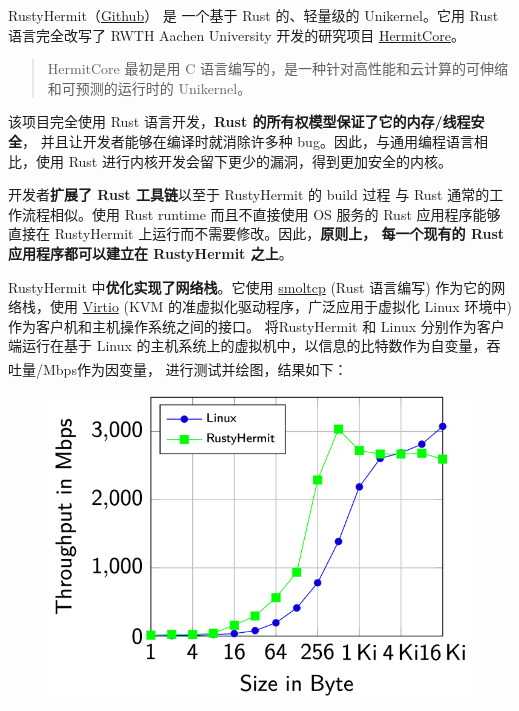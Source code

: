\documentclass[UTF8,fontset=none,linespread=1.15]{ctexart}
\let\nosupcite\cite
\renewcommand*{\cite}[1]{\textsuperscript{\nosupcite{#1}}}
\begin{document}
RustyHermit（\href{https://github.com/hermitcore/rusty-hermit}{Github}） 是
一个基于 Rust 的、轻量级的 Unikernel。它用 Rust 语言完全改写了 RWTH Aachen University
 开发的研究项目 \href{http://hermitcore.org/}{HermitCore}。

\begin{quote}
HermitCore 最初是用 C 语言编写的，是一种针对高性能和云计算的可伸缩和可预测的运行时的 Unikernel。
\end{quote}

该项目完全使用 Rust 语言开发，\textbf{Rust 的所有权模型保证了它的内存/线程安全}，
并且让开发者能够在编译时就消除许多种 bug。因此，与通用编程语言相比，使用 Rust
 进行内核开发会留下更少的漏洞，得到更加安全的内核。

开发者\textbf{扩展了 Rust 工具链}以至于 RustyHermit 的 build 过程
与 Rust 通常的工作流程相似。使用 Rust runtime 而且不直接使用 OS 服务的
 Rust 应用程序能够直接在 RustyHermit 上运行而不需要修改。因此，\textbf{原则上，
 每一个现有的 Rust 应用程序都可以建立在 RustyHermit 之上}。


RustyHermit 中\textbf{优化实现了网络栈}。它使用 \href{https://github.com/smoltcp-rs/smoltcp}{smoltcp} (Rust 语言编写)
作为它的网络栈，使用 \href{https://www.linux-kvm.org/page/Virtio}{Virtio}
(KVM 的准虚拟化驱动程序，广泛应用于虚拟化 Linux 环境中) 作为客户机和主机操作系统之间的接口。
将RustyHermit 和 Linux 分别作为客户端运行在基于 Linux 的主机系统上的虚拟机中，以信息的比特数作为自变量，吞吐量/Mbps作为因变量，
进行测试并绘图，结果如下：\cite{bib:20-linux-kernel}
\begin{figure}[H]
\includegraphics[width=\linewidth]{pictures/RustyHermit-1.png}
\caption{}
\end{figure}
\end{document}
